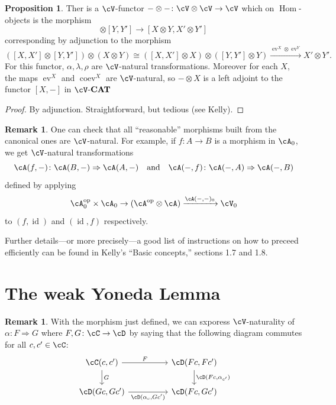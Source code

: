 \documentclass[a4paper,11pt,oneside,openany]{scrbook}
\newcommand{\catname}[1]{{\normalfont\textbf{#1}}}
\newcommand{\CAT}{\catname{CAT}}
\newcommand{\from}{\colon}
\newcommand{\iso}{\cong}
\DeclareMathOperator{\Hom}{\text{Hom}}
\DeclareMathOperator{\op}{\text{op}}
\DeclareMathOperator{\id}{id}
\DeclareMathOperator{\coev}{coev}
\DeclareMathOperator{\ev}{ev}
\theoremstyle{definition}
\theoremstyle{definition}
\newtheorem{prop}[thm]{Proposition}
\newtheorem{rmk}[thm]{Remark}
\begin{document}
\begin{prop}
    Ther is a $ \cV $-functor $ -\otimes -\from \cV \otimes \cV \to \cV $ which on $ \Hom $-objects is the morphism
    \begin{displaymath}
        [X,X']\otimes [Y,Y'] \to [X\otimes Y , X'\otimes Y']
    \end{displaymath}
    corresponding by adjunction to the morphism
    \begin{displaymath}
        ([X,X']\otimes[Y,Y']) \otimes (X\otimes Y)\iso ([X,X']\otimes X)\otimes ([Y,Y']\otimes Y) \xrightarrow{\ev^X \otimes \ev^Y} X'\otimes Y'.
    \end{displaymath}
    For this functor, $ \alpha,\lambda,\rho $ are $ \cV $-natural transformations. Moreover for each $ X $, the maps $ \ev^X $ and $ \coev^X $ are $ \cV $-natural, so $ -\otimes X $ is a left adjoint to the functor $ [X,-] $ in $ \cV $-$\CAT$
\end{prop}
\begin{proof}
    By adjunction. Straightforward, but tedious (see Kelly).
\end{proof}
\begin{rmk}
    One can check that all ``reasonable'' morphisms built from the canonical ones are $ \cV $-natural.
    For example, if $ f \from A \to B $ is a morphism in $ \cA_0 $, we get $ \cV $-natural transformations 
    \begin{displaymath}
        \cA(f,-) \from \cA(B,-)\Rightarrow \cA(A,-) \quad \text{and} \quad  \cA(-,f) \from \cA(-,A) \Rightarrow \cA(-,B) 
    \end{displaymath}defined by applying
    \begin{displaymath}
        \cA_0^{\op}\times \cA_0 \to (\cA^{\op} \otimes \cA) \xrightarrow{\cA(-,-)_0} \cV_0
    \end{displaymath}
    to $ (f,\id) $ and $ (\id,f) $ respectively.
    
    Further details---or more precisely---a good list of instructions on how to preceed efficiently can be found in Kelly's ``Basic concepts,'' sections 1.7 and 1.8.
\end{rmk}


\section{The weak Yoneda Lemma}

\begin{rmk}
    With the morphism just defined, we can sxporess $ \cV $-naturality of $ \alpha \from F \Rightarrow G $ where $ F,G\from \cC \to \cD $ by saying that the following diagram commutes for all $ c,c' \in \cC $:
    \begin{displaymath}
	\begin{tikzcd}[column sep = huge]
	    \cC(c,c') \arrow[r, "F"]\arrow[d, "G"]& \cD(Fc, Fc')\arrow[d, "{\cD(Fc,\alpha_{c'})}"] \\
	    \cD(Gc,Gc') \arrow[r, "{\cD(\alpha_c, Gc')}"' ]& \cD(Fc,Gc')
        \end{tikzcd}
    \end{displaymath}
\end{rmk}
\end{document}
